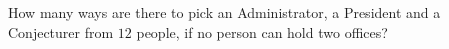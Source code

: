 How many ways are there to pick an Administrator, a President and a Conjecturer from $12$ people, if no person can hold two offices?
